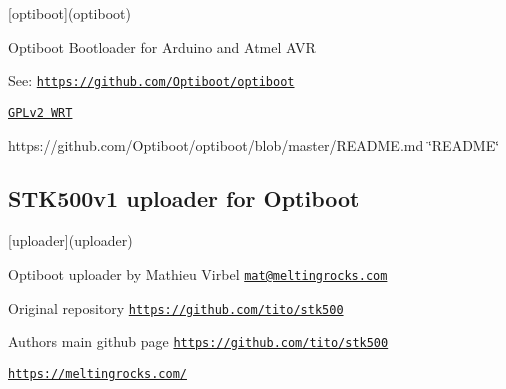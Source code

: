 \begin{DoxyItemize}
\item \mbox{[}optiboot\mbox{]}(optiboot)
\begin{DoxyItemize}
\item Optiboot Bootloader for Arduino and Atmel A\+VR
\item See\+: \href{https://github.com/Optiboot/optiboot}{\tt https\+://github.\+com/\+Optiboot/optiboot}
\begin{DoxyItemize}
\item \href{https://github.com/Optiboot/optiboot/blob/master/LICENSE}{\tt G\+P\+Lv2 W\+RT}
\item https\+://github.com/\+Optiboot/optiboot/blob/master/\+R\+E\+A\+D\+M\+E.\+md \char`\"{}\+R\+E\+A\+D\+M\+E\char`\"{} 


\end{DoxyItemize}
\end{DoxyItemize}
\end{DoxyItemize}

\subsection*{S\+T\+K500v1 uploader for Optiboot}


\begin{DoxyItemize}
\item \mbox{[}uploader\mbox{]}(uploader)
\begin{DoxyItemize}
\item Optiboot uploader by Mathieu Virbel \href{mailto:mat@meltingrocks.com}{\tt mat@meltingrocks.\+com}
\begin{DoxyItemize}
\item Original repository \href{https://github.com/tito/stk500}{\tt https\+://github.\+com/tito/stk500}
\begin{DoxyItemize}
\item Authors main github page \href{https://github.com/tito/stk500}{\tt https\+://github.\+com/tito/stk500}
\begin{DoxyItemize}
\item \href{https://meltingrocks.com/}{\tt https\+://meltingrocks.\+com/}
\end{DoxyItemize}
\end{DoxyItemize}
\end{DoxyItemize}
\end{DoxyItemize}
\end{DoxyItemize}





